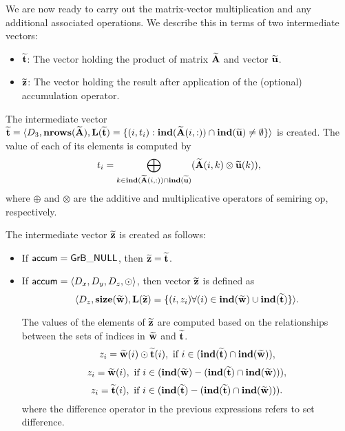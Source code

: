 We are now ready to carry out the matrix-vector multiplication and any additional 
associated operations.  We describe this in terms of two intermediate vectors:
\begin{itemize}
	\item ${\bf \widetilde{t}}$: The vector holding the product of matrix 
    ${\bf \widetilde{A}}$ and vector ${\bf \widetilde{u}}$.
	\item ${\bf \widetilde{z}}$: The vector holding the result after 
    application of the (optional) accumulation operator.
\end{itemize}

The intermediate vector ${\bf \widetilde{t}} = \langle
D_3, \bold{nrows}({\bf \widetilde{A}}),
\bold{L}({\bf \widetilde{t}}) =
\{(i,t_i) : \bold{ind}({\bf \widetilde{A}}(i,:)) \cap 
\bold{ind}({\bf \widetilde{u}})
 \neq \emptyset \} \rangle$
is created.  The value of each of its elements is computed by 
\[t_i = \bigoplus_{k \in \bold{ind}({\bf \widetilde{A}}(i,:)) \cap
\bold{ind}({\bf \widetilde{u}})} ({\bf \widetilde{A}}(i,k)
\otimes {\bf \widetilde{u}}(k)),\] where $\oplus$ and $\otimes$
are the additive and multiplicative operators of semiring {\sf op},
respectively.

The intermediate vector ${\bf \widetilde{z}}$ is created as follows:
\begin{itemize}
    \item If ${\sf accum} = {\sf GrB\_NULL}$, then ${\bf \widetilde{z}} = {\bf \widetilde{t}}$.
    
    \item If ${\sf accum} = \langle D_x, D_y, D_z, \odot \rangle$, then vector ${\bf \widetilde{z}}$ is defined as 
        \[ \langle D_z, \bold{size}({\bf \widetilde{w}}), 
        \bold{L}({\bf \widetilde{z}}) 
		= \{(i,z_{i})  \forall (i) \in \bold{ind}({\bf \widetilde{w}}) \cup 
        \bold{ind}({\bf \widetilde{t}}) \} \rangle.\]  

    The values of the elements of ${\bf \widetilde{z}}$ are computed based on the 
    relationships between the sets of indices in ${\bf \widetilde{w}}$ and 
    ${\bf \widetilde{t}}$.
\[
z_{i} = {\bf \widetilde{w}}(i) \odot {\bf \widetilde{t}}(i), \ \mbox{if}\  i \in  (\bold{ind}({\bf \widetilde{t}}) \cap \bold{ind}({\bf \widetilde{w}})),
\]
\[
z_{i} = \vector{\widetilde{w}}(i), \ \mbox{if}\  i \in  (\bold{ind}(\vector{\widetilde{w}}) - (\bold{ind}(\vector{\widetilde{t}}) \cap \bold{ind}(\vector{\widetilde{w}}))),
\]
\[
z_{i} = \vector{\widetilde{t}}(i), \ \mbox{if}\  i \in  (\bold{ind}(\vector{\widetilde{t}}) - (\bold{ind}(\vector{\widetilde{t}}) \cap \bold{ind}(\vector{\widetilde{w}}))).
\]
where the difference operator in the previous expressions refers to set difference.
\end{itemize}


